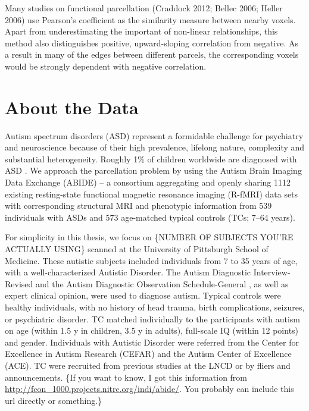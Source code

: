 Many studies on functional parcellation (Craddock 2012; Bellec 2006;
Heller 2006) use Pearson's coefficient as the similarity measure between
nearby voxels. Apart from underestimating the important of non-linear
relationships, this method also distinguishes positive, upward-sloping
correlation from negative. As a result in many of the edges between
different parcels, the corresponding voxels would be strongly dependent
with negative correlation.


\section{About the Data}
{\color{blue}

Autism spectrum disorders (ASD) represent a formidable challenge for
psychiatry and neuroscience because of their high prevalence, lifelong
nature, complexity and substantial heterogeneity. Roughly 1\% of
children worldwide are diagnosed with ASD \cite{centers2010autism}.
We approach the parcellation problem by using the Autism Brain Imaging
Data Exchange (ABIDE) -- a consortium aggregating and openly sharing
1112 existing resting-state functional magnetic resonance imaging
(R-fMRI) data sets with corresponding structural MRI and phenotypic
information from 539 individuals with ASDs and 573 age-matched typical
controls (TCs; 7–64 years).

For simplicity in this thesis, we focus on
\{NUMBER OF SUBJECTS YOU'RE ACTUALLY USING\}
scanned at the University of Pittsburgh School of Medicine.
These autistic subjects included individuals from 7 to 35 years of age,
with a well-characterized Autistic Disorder. The Autism Diagnostic
Interview-Revised \cite{lord1994autism} and the Autism Diagnostic
Observation Schedule-General \cite{lord2000autism}, as well as expert
clinical opinion, were used to diagnose autism. Typical controls were
healthy individuals, with no history of head trauma, birth
complications, seizures, or psychiatric disorder. TC matched
individually to the participants with autism on age (within 1.5 y in
children, 3.5 y in adults), full-scale IQ (within 12 points) and gender.
Individuals with Autistic Disorder were referred from the Center for
Excellence in Autism Research (CEFAR) and the Autism Center of
Excellence (ACE). TC were recruited from previous studies at the LNCD or
by fliers and announcements.
\{If you want to know, I got this information from
\url{http://fcon_1000.projects.nitrc.org/indi/abide/}.
You probably can include this url directly or something.\}

}
